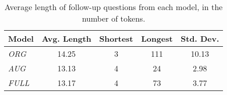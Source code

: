 \begin{table}[t]
    \centering
    \scriptsize
    \begin{tabular}{lcccc}
        \toprule
        \textbf{Model} & \textbf{Avg. Length} & \textbf{Shortest} & \textbf{Longest} & \textbf{Std. Dev.} \\
        \midrule
        \textit{ORG}   & 14.25 & 3  & 111 & 10.13 \\
        \textit{AUG}   & 13.13 & 4  & 24  & 2.98 \\
        \textit{FULL}  & 13.17 & 4  & 73  & 3.77 \\
        \bottomrule
    \end{tabular}
    \caption{Average length of follow-up questions from each model, in the number of tokens.}
    \label{tab:length_stats}
\end{table}